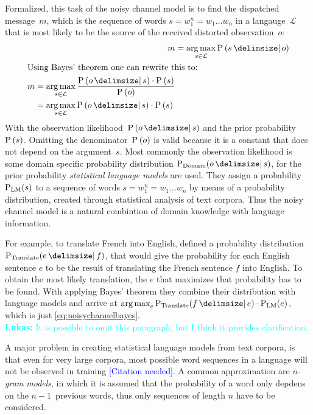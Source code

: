 \documentclass[11pt,a4paper]{report}
\DeclareMathOperator*{\Argmax}{arg\,max}
\newcommand{\Language}{\mathcal{L}}
\newcommand{\lukas}[1]{\textcolor{cyan}{{\footnotesize\textbf{Lukas:}} #1}}
\newcommand{\noref}{\textcolor{blue}{\footnotesize[Citation needed]}}
\begin{document}
Formalized, this task of the noisy channel model is to find the dispatched
message~$m$, which is the sequence of words $s = w_1^n = w_1 \ldots w_n$ in a
langauge~$\Language$ that is most likely to be the source of the received
distorted observation~$o$:
\begin{align}
  \label{eq:noisychannel}
  m &= \Argmax_{s \in \Language} \Prob{s}{o} \\
  \intertext{Using Bayes' theorem one can rewrite this to:}
  \label{eq:noisychannelbayes}
  \begin{split}
    m &= \Argmax_{s \in \Language} \frac{\Prob{o}{s} \cdot \Prob{s}}{\Prob{o}} \\
      &= \Argmax_{s \in \Language} \Prob{o}{s} \cdot \Prob{s}
  \end{split}
\end{align}
With the observation likelihood~$\Prob{o}{s}$ and the prior
probability~$\Prob{s}$.
Omitting the denominator~$\Prob{o}$ is valid because it is a constant that does
not depend on the argument~$s$.
Most commonly the observation likelihood is some domain specific probability
distribution $\Prob[\text{Domain}]{o}{s}$, for the prior probability
\emph{statistical language models} are used.
They assign a probability $\Prob[\text{LM}]{s}$ to a sequence of words
$s = w_1^n = w_1 \ldots w_n$ by means of a probability distribution, created
through statistical analysis of text corpora.
Thus the noisy channel model is a natural combintion of domain knowledge with
language information.

For example, to translate French into English, \cite{Brown1990} defined a
probability distribution $\Prob[\text{Translate}]{e}{f}$, that would give the
probability for each English sentence $e$ to be the result of translating
the French sentence $f$ into English.
To obtain the most likely translation, the $e$ that maximizes that probability
has to be found.
With applying Bayes' theorem they combine their distribution with language
models and arrive at
$\Argmax_{e} \Prob[\text{Translate}]{f}{e} \cdot \Prob[\text{LM}]{e}$, which is
just \cref{eq:noisychannelbayes}.
\\ \lukas{It is possible to omit this paragraph, but I think it provides
clarification.}

A major problem in creating statistical language models from text corpora, is
that even for very large corpora, most possible word sequences in a language
will not be observed in training \noref.
A common approximation are \emph{$n$-gram models}, in which it is assumed that
the probability of a word only depdens on the $n\!-\!1$~previous words, thus
only sequences of length $n$ have to be considered.
\end{document}
